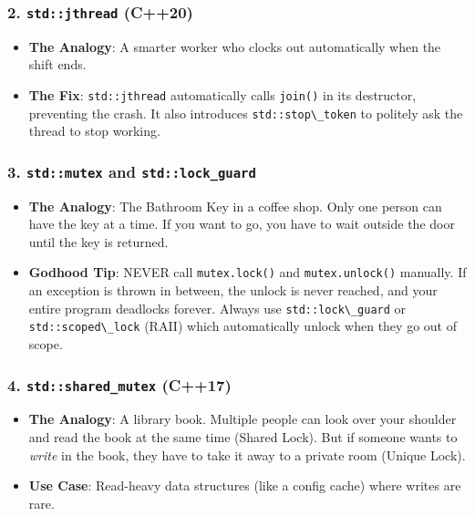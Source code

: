 \hypertarget{stdjthread-c20}{%
\subsubsection{\texorpdfstring{2. \texttt{std::jthread}
(C++20)}{2. std::jthread (C++20)}}\label{stdjthread-c20}}

\begin{itemize}
\tightlist
\item
  \textbf{The Analogy}: A smarter worker who clocks out automatically
  when the shift ends.
\item
  \textbf{The Fix}: \passthrough{\lstinline!std::jthread!} automatically
  calls \passthrough{\lstinline!join()!} in its destructor, preventing
  the crash. It also introduces
  \passthrough{\lstinline!std::stop\_token!} to politely ask the thread
  to stop working.
\end{itemize}

\hypertarget{stdmutex-and-stdlock_guard}{%
\subsubsection{\texorpdfstring{3. \texttt{std::mutex} and
\texttt{std::lock\_guard}}{3. std::mutex and std::lock\_guard}}\label{stdmutex-and-stdlock_guard}}

\begin{itemize}
\tightlist
\item
  \textbf{The Analogy}: The Bathroom Key in a coffee shop. Only one
  person can have the key at a time. If you want to go, you have to wait
  outside the door until the key is returned.
\item
  \textbf{Godhood Tip}: NEVER call
  \passthrough{\lstinline!mutex.lock()!} and
  \passthrough{\lstinline!mutex.unlock()!} manually. If an exception is
  thrown in between, the unlock is never reached, and your entire
  program deadlocks forever. Always use
  \passthrough{\lstinline!std::lock\_guard!} or
  \passthrough{\lstinline!std::scoped\_lock!} (RAII) which automatically
  unlock when they go out of scope.
\end{itemize}

\hypertarget{stdshared_mutex-c17}{%
\subsubsection{\texorpdfstring{4. \texttt{std::shared\_mutex}
(C++17)}{4. std::shared\_mutex (C++17)}}\label{stdshared_mutex-c17}}

\begin{itemize}
\tightlist
\item
  \textbf{The Analogy}: A library book. Multiple people can look over
  your shoulder and read the book at the same time (Shared Lock). But if
  someone wants to \emph{write} in the book, they have to take it away
  to a private room (Unique Lock).
\item
  \textbf{Use Case}: Read-heavy data structures (like a config cache)
  where writes are rare.
\end{itemize}

